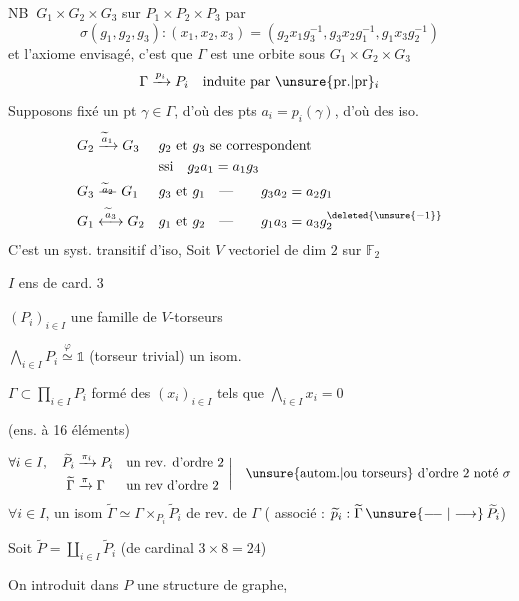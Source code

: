 NB \(\ G_1\times G_2\times G_3\)  sur \(P_1\times P_2\times P_3\) par
\[
 \sigma(g_1,g_2,g_3)\mathbin{:}(x_1,x_2,x_3)
 =(g_2x_1g_3^{-1},g_3x_2g_1^{-1},g_1x_3g_2^{-1})
\]
et l'axiome envisagé, c'est que \(\Gamma\) est une orbite sous \(G_1\times G_2\times G_3\)
\[
 \Gamma\xrightarrow{p_i}P_i\quad\text{induite par \unsure{pr.|pr}$_i$}
\]
 Supposons fixé un pt \(\gamma\in \Gamma\), d'où des pts \(a_i=p_i(\gamma)\), d'où des iso.
\[
\begin{aligned}
 G_2&\xrightarrow{\widetilde a_1}G_3&
 &g_2\text{ et }g_3\text{ se correspondent}\\
 &&&\text{ssi}\quad g_2a_1=a_1g_3\\
 G_3&\overset{\widetilde a_2}{\relbar\joinrel\relbar} G_1&
 &g_3\text{ et }g_1\quad\text{---}\qquad g_3a_2=a_2g_1\\
 G_1&\overset{\widetilde a_3}{\longleftrightarrow}G_2&
 &g_1\text{ et }g_2\quad\text{---}\qquad g_1a_3=a_3g_2^{\deleted{\unsure{-1}}}
\end{aligned}
\]
C'est un syst. transitif d'iso, 
Soit \(V\) vectoriel de dim \(2\) sur \(\mathbb F_2\)

\(I\) ens de card. \(3\)

\((P_i)_{i\in I}\) une famille de \(V\)-torseurs

\(\bigwedge_{i\in I}P_i\overset{\varphi}{\simeq}\mathbb{1}\) (torseur trivial) un isom.

\(\Gamma\subset\prod_{i\in I}P_i\) formé des \((x_i)_{i\in I}\) tels que \(\bigwedge_{i\in I}x_i=0\)

(ens. à 16 éléments)

\[
 \begin{aligned}
 \forall i\in I,\quad \widetilde P_i&\xrightarrow{\pi_i}P_i&&\text{un rev. d'ordre 2}\\
 \widetilde \Gamma&\xrightarrow{\pi}\Gamma&&\text{un rev d'ordre 2}
 \end{aligned}\ \bigg|\quad\text{\unsure{autom.|ou torseurs} d'ordre 2 noté }\sigma
\]
\(\forall i\in I\), un isom \(\widetilde \Gamma\simeq \Gamma\times_{P_i}\widetilde P_i\) de rev. de \(\Gamma\) ( associé : \(\widetilde p_i:\widetilde \Gamma\,\unsure{\relbar\joinrel\relbar|\longrightarrow}\,\widetilde P_i\))

Soit \(\widetilde P=\coprod_{i\in I}\widetilde P_i\) (de cardinal \(3\times8=24\))

On introduit dans \(P\) une structure de graphe,

